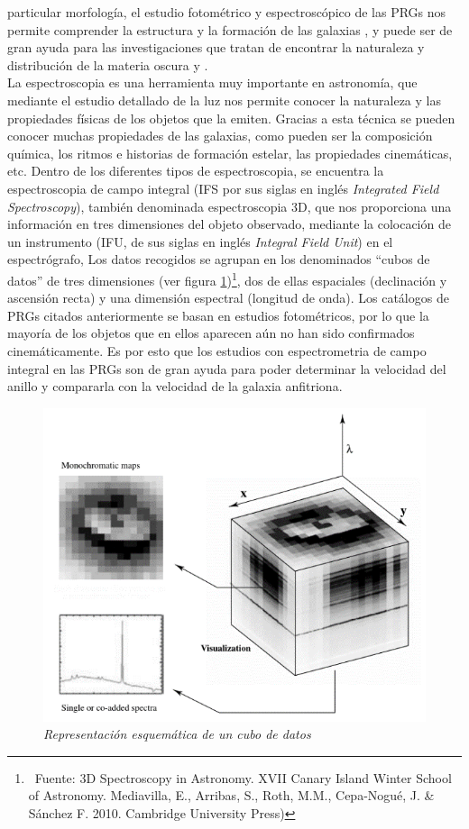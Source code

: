 \documentclass{article}
\begin{document}
particular morfología, el estudio fotométrico y espectroscópico de las PRGs nos permite comprender la estructura y la formación de las galaxias \cite{Iodice2014}, y puede ser de gran ayuda para las investigaciones que tratan de encontrar la naturaleza y distribución de la materia oscura \cite{Brook2008} y \cite{Moiseev2008}.\\La espectroscopia es una herramienta muy importante en astronomía, que mediante el estudio detallado de la luz nos permite conocer la naturaleza y las propiedades físicas de los objetos que la emiten. Gracias a esta técnica se pueden conocer muchas propiedades de las galaxias, como pueden ser la composición química, los ritmos e historias de formación estelar, las propiedades cinemáticas, etc. Dentro de los diferentes tipos de espectroscopia, se encuentra la espectroscopia de campo integral (IFS por sus siglas en inglés \emph{Integrated Field Spectroscopy}), también denominada espectroscopia 3D, que nos proporciona una información en tres dimensiones del objeto observado, mediante la colocación de un instrumento (IFU, de sus siglas en inglés \emph{Integral Field Unit}) en el espectrógrafo, Los datos recogidos se agrupan en los denominados “cubos de datos” de tres dimensiones (ver figura \ref{figura 1})\footnote{\ Fuente: 3D Spectroscopy in Astronomy. XVII Canary Island Winter School of Astronomy. Mediavilla, E., Arribas, S., Roth, M.M., Cepa-Nogué, J. \& Sánchez F. 2010. Cambridge University Press)}, dos de ellas espaciales (declinación y ascensión recta) y una dimensión espectral (longitud de onda). Los catálogos de PRGs citados anteriormente se basan en estudios fotométricos, por lo que la mayoría de los objetos que en ellos aparecen aún no han sido confirmados cinemáticamente. Es por esto que los estudios con espectrometria de campo integral en las PRGs son de gran ayuda para poder determinar la velocidad del anillo y compararla con la velocidad de la galaxia anfitriona.
\begin{figure}[H]
	\includegraphics[scale=.80]{imagen1.png}
	\centering	
	\caption{\emph{Representación esquemática de un cubo de datos}}
	\label{figura 1}
\end{figure}
\end{document}
